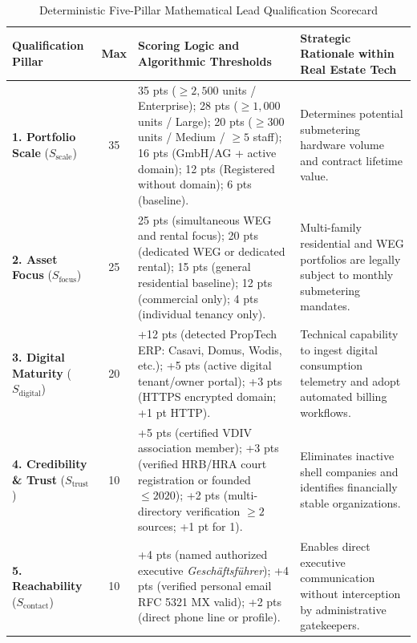 \documentclass[11pt,a4paper]{article}
\begin{document}
\begin{table}[htbp]
\centering
\caption{Deterministic Five-Pillar Mathematical Lead Qualification Scorecard}
\label{tab:scorecard}
\footnotesize
\begin{tabularx}{\textwidth}{l c X X}
\toprule
\textbf{Qualification Pillar} & \textbf{Max} & \textbf{Scoring Logic and Algorithmic Thresholds} & \textbf{Strategic Rationale within Real Estate Tech} \\
\midrule
\textbf{1. Portfolio Scale} ($S_{\text{scale}}$) & 35 & 35 pts ($\ge 2,500$ units / Enterprise); 28 pts ($\ge 1,000$ units / Large); 20 pts ($\ge 300$ units / Medium / $\ge 5$ staff); 16 pts (GmbH/AG + active domain); 12 pts (Registered without domain); 6 pts (baseline). & Determines potential submetering hardware volume and contract lifetime value. \\
\addlinespace
\textbf{2. Asset Focus} ($S_{\text{focus}}$) & 25 & 25 pts (simultaneous WEG and rental focus); 20 pts (dedicated WEG or dedicated rental); 15 pts (general residential baseline); 12 pts (commercial only); 4 pts (individual tenancy only). & Multi-family residential and WEG portfolios are legally subject to monthly submetering mandates. \\
\addlinespace
\textbf{3. Digital Maturity} ($S_{\text{digital}}$) & 20 & +12 pts (detected PropTech ERP: Casavi, Domus, Wodis, etc.); +5 pts (active digital tenant/owner portal); +3 pts (HTTPS encrypted domain; +1 pt HTTP). & Technical capability to ingest digital consumption telemetry and adopt automated billing workflows. \\
\addlinespace
\textbf{4. Credibility \& Trust} ($S_{\text{trust}}$) & 10 & +5 pts (certified VDIV association member); +3 pts (verified HRB/HRA court registration or founded $\le 2020$); +2 pts (multi-directory verification $\ge 2$ sources; +1 pt for 1). & Eliminates inactive shell companies and identifies financially stable organizations. \\
\addlinespace
\textbf{5. Reachability} ($S_{\text{contact}}$) & 10 & +4 pts (named authorized executive \textit{Gesch\"aftsf\"uhrer}); +4 pts (verified personal email RFC 5321 MX valid); +2 pts (direct phone line or profile). & Enables direct executive communication without interception by administrative gatekeepers. \\
\bottomrule
\end{tabularx}
\end{table}
\end{document}
